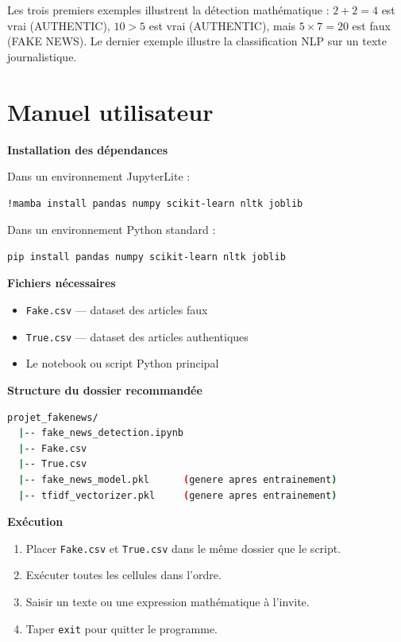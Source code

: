 \documentclass[a4paper, 12pt, twoside]{article}
\begin{document}
Les trois premiers exemples illustrent la détection mathématique :
$2+2=4$ est vrai (AUTHENTIC), $10>5$ est vrai (AUTHENTIC), mais
$5 \times 7 = 20$ est faux (FAKE NEWS). Le dernier exemple illustre
la classification NLP sur un texte journalistique.

\section{Manuel utilisateur}

\textbf{Installation des dépendances}

Dans un environnement JupyterLite :
\begin{lstlisting}[language=bash, numbers=none]
!mamba install pandas numpy scikit-learn nltk joblib
\end{lstlisting}

Dans un environnement Python standard :
\begin{lstlisting}[language=bash, numbers=none]
pip install pandas numpy scikit-learn nltk joblib
\end{lstlisting}

\medskip
\textbf{Fichiers nécessaires}
\begin{itemize}
  \item \texttt{Fake.csv} --- dataset des articles faux
  \item \texttt{True.csv} --- dataset des articles authentiques
  \item Le notebook ou script Python principal
\end{itemize}

\medskip
\textbf{Structure du dossier recommandée}
\begin{lstlisting}[language=bash, numbers=none]
projet_fakenews/
  |-- fake_news_detection.ipynb
  |-- Fake.csv
  |-- True.csv
  |-- fake_news_model.pkl      (genere apres entrainement)
  |-- tfidf_vectorizer.pkl     (genere apres entrainement)
\end{lstlisting}

\medskip
\textbf{Exécution}
\begin{enumerate}
  \item Placer \texttt{Fake.csv} et \texttt{True.csv} dans le même dossier
        que le script.
  \item Exécuter toutes les cellules dans l'ordre.
  \item Saisir un texte ou une expression mathématique à l'invite.
  \item Taper \texttt{exit} pour quitter le programme.
\end{enumerate}
\end{document}
